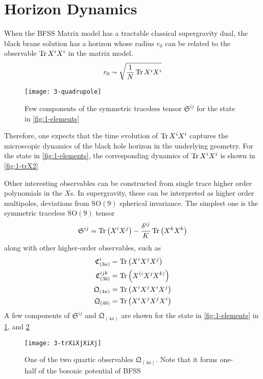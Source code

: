 \section{Horizon Dynamics}

When the BFSS Matrix model has a tractable classical supergravity dual, the black brane solution has a horizon whose radius $r_0$ can be related to the observable $\Tr X^i X^i$ in the matrix model.
\begin{equation}
    r_0 \sim \sqrt{\frac{1}{N} \Tr X^i X^i}
\end{equation}

\begin{figure}[H]
    \centering
    \texttt{[image: 3-quadrupole]}
    \caption{Few components of the symmetric traceless tensor $\mathfrak{S}^{i j}$ for the state in \cref{fig:1-elements}}
    \label{fig:3-quadrupole}
\end{figure}

Therefore, one expects that the time evolution of $\Tr X^i X^i$ captures the microscopic dynamics of the black hole horizon in the underlying geometry. For the state in \cref{fig:1-elements}, the corresponding dynamics of $\Tr X^i X^i$ is shown in \cref{fig:1-trX2}

Other interesting observables can be constructed from single trace higher order polynomials in the $X$s. In supergravity, these can be interpreted as higher order multipoles, deviations from $\mathrm{SO}(9)$ spherical invariance. The simplest one is the symmetric traceless $\mathrm{SO}(9)$ tensor
\begin{equation}\label{eqn:symm-trace-tensor}
    \mathfrak{S}^{i j} = \Tr \left( X^i X^j \right) - \frac{\delta^{i j}}{K} \Tr \left( X^k X^k \right)
\end{equation}
along with other higher-order observables, such as
\begin{align}
    \mathfrak{C}_{(3a)}^{i} &= \Tr \left( X^{i} X^j X^{j} \right) \\
    \mathfrak{C}_{(3b)}^{i j k} &= \Tr \left( X^{(i} X^j X^{k)} \right) \\
    \mathfrak{Q}_{(4a)} &= \Tr \left( X^i X^j X^i X^j \right) \\
    \mathfrak{Q}_{(4b)} &= \Tr \left( X^i X^j X^j X^i \right)
\end{align}
A few components of $\mathfrak{S}^{i j}$ and $\mathfrak{Q}_{(4a)}$ are shown for the state in \cref{fig:1-elements} in \cref{fig:3-quadrupole}, and \cref{fig:3-trXiXjXiXj}

\begin{figure}[H]
    \centering
    \texttt{[image: 3-trXiXjXiXj]}
    \caption{One of the two quartic observables $\mathfrak{Q}_{(4a)}$. Note that it forms one-half of the bosonic potential of BFSS}
    \label{fig:3-trXiXjXiXj}
\end{figure}

